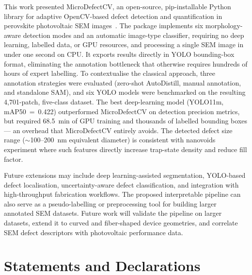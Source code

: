 \documentclass[pdflatex,sn-mathphys-num,iicol]{sn-jnl}
\theoremstyle{thmstyleone}
\theoremstyle{thmstyletwo}
\theoremstyle{thmstylethree}
\begin{document}
This work presented MicroDefectCV, an open-source, pip-installable
Python library for adaptive OpenCV-based defect detection and
quantification in perovskite photovoltaic SEM images~\cite{microdefectcv2025}.
The package implements six morphology-aware detection modes and an
automatic image-type classifier, requiring no deep learning, labelled
data, or GPU resources, and processing a single SEM image in under
one second on CPU. It exports results directly in YOLO bounding-box
format, eliminating the annotation bottleneck that otherwise requires
hundreds of hours of expert labelling. To contextualise the classical
approach, three annotation strategies were evaluated (zero-shot
AutoDistill, manual annotation, and standalone SAM), and six YOLO
models were benchmarked on the resulting 4{,}701-patch, five-class
dataset. The best deep-learning model (YOLO11m, mAP50~=~0.422)
outperformed MicroDefectCV on detection precision metrics, but
required 68.5~min of GPU training and thousands of labelled bounding
boxes --- an overhead that MicroDefectCV entirely avoids. The detected
defect size range ($\sim$100--200~nm equivalent diameter) is consistent
with nanovoids experiment where such features directly increase trap-state density and reduce fill factor. 

Future extensions may include deep learning-assisted segmentation,
YOLO-based defect localisation, uncertainty-aware defect
classification, and integration with high-throughput fabrication
workflows. The proposed interpretable pipeline can also serve as a
pseudo-labelling or preprocessing tool for building larger annotated
SEM datasets. Future work will validate the pipeline on larger datasets, extend it to curved and fiber-shaped device geometries, and correlate SEM defect descriptors
with photovoltaic performance data.


\backmatter




\clearpage
\section*{Statements and Declarations}
\end{document}
